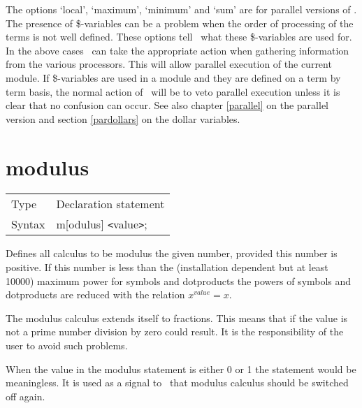 
\noindent The options `local', `maximum', `minimum' and `sum' are for 
parallel versions of \FORM. The presence of \$-variables can be a problem 
when the order of processing of the terms is not well defined. These 
options tell \FORM\ what these \$-variables are used for. In the above 
cases \FORM\ can take the appropriate action when gathering information 
from the various processors. This will allow
parallel execution of the current module. If
\$-variables are used in a module and they are defined on a term by term
basis, the normal action of \FORM\ will be to veto parallel execution unless
it is clear that no confusion can occur. See also chapter \ref{parallel} on
the parallel version and section \ref{pardollars} on the dollar variables.\vspace{10mm}

 
\section{modulus}
\label{substamodulus}

\noindent \begin{tabular}{ll}
Type & Declaration statement\\
Syntax & m[odulus] {\tt<}value{\tt>};
\end{tabular} \vspace{4mm}

\noindent Defines all calculus to be modulus the given 
number, provided this number is positive. If this number is less than the 
(installation dependent but at least 10000) maximum power for symbols and 
dotproducts the powers of symbols and dotproducts are reduced with the 
relation $x^{value} = x$.

\noindent The modulus calculus extends itself to 
fractions. This means that if the value is not a prime 
number division by zero could result. It is the responsibility of the user 
to avoid such problems.

\noindent When the value in the modulus statement is either 0 or 1 the 
statement would be meaningless. It is used as a signal to \FORM\ that modulus 
calculus should be switched off again.

